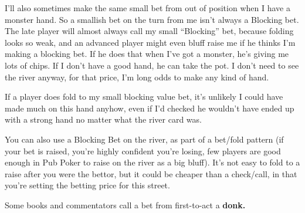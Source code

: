 I'll also sometimes make the same small bet from out of position
when I have a monster hand. So a smallish bet on the turn from me
isn't always a Blocking bet. The late player will almost always call
my small ``Blocking'' bet, because folding looks so weak, and an
advanced player might even bluff raise me if he thinks I'm making
a blocking bet. If he does that when I've got a monster, he's giving
me lots of chips. If I don't have a good hand, he can take the pot.
I don't need to see the river anyway, for that price, I'm long odds to
make any kind of hand.

If a player does fold to my small blocking value bet, it's unlikely
I could have made much on this hand anyhow, even if I'd checked
he wouldn't have ended up with a strong hand no matter what
the river card was.

You can also use a Blocking Bet on the river, as part of a
bet/fold pattern (if your bet is raised, you're highly
confident you're losing, few players are good enough in
Pub Poker to raise on the river as a big bluff). It's not
easy to fold to a raise after you were the bettor, but it could
be cheaper than a check/call, in that you're setting the betting
price for this street.

Some books and commentators call a bet from first-to-act a \textbf{donk.}


